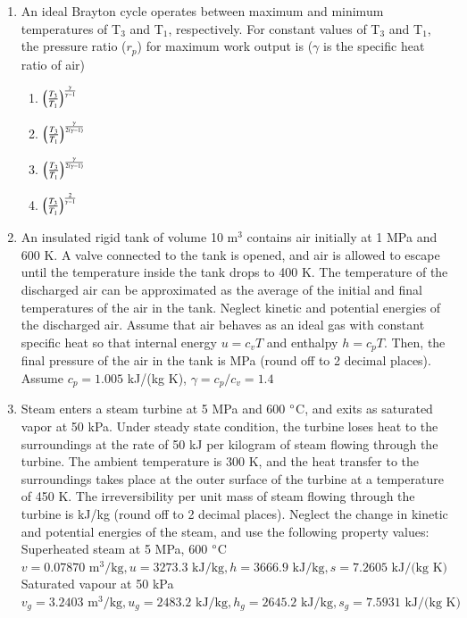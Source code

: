 \documentclass[a4paper,10pt]{article}
\begin{document}
\begin{enumerate}
\item An ideal Brayton cycle operates between maximum and minimum temperatures of T$_3$ and T$_1$, respectively. For constant values of T$_3$ and T$_1$, the pressure ratio ($r_p$) for maximum work output is ($\gamma$ is the specific heat ratio of air)

\hfill{}
\begin{enumerate}
    \item $\left(\frac{T_3}{T_1}\right)^{\frac{\gamma}{\gamma-1}}$
    \item $\left(\frac{T_3}{T_1}\right)^{\frac{\gamma}{2(\gamma-1)}}$
    \item $\left(\frac{T_3}{T_1}\right)^{\frac{\gamma}{2(\gamma-1)}}$
    \item $\left(\frac{T_3}{T_1}\right)^{\frac{2}{\gamma-1}}$
\end{enumerate}

\item An insulated rigid tank of volume 10 m$^3$ contains air initially at 1 MPa and 600 K. A valve connected to the tank is opened, and air is allowed to escape until the temperature inside the tank drops to 400 K. The temperature of the discharged air can be approximated as the average of the initial and final temperatures of the air in the tank. Neglect kinetic and potential energies of the discharged air. Assume that air behaves as an ideal gas with constant specific heat so that internal energy $u = c_vT$ and enthalpy $h = c_pT$. Then, the final pressure of the air in the tank is \underline{\hspace{2cm}} MPa (round off to 2 decimal places). Assume $c_p = 1.005$ kJ/(kg K), $\gamma = c_p/c_v = 1.4$

\hfill{}

\item Steam enters a steam turbine at 5 MPa and 600 $\degree$C, and exits as saturated vapor at 50 kPa. Under steady state condition, the turbine loses heat to the surroundings at the rate of 50 kJ per kilogram of steam flowing through the turbine. The ambient temperature is 300 K, and the heat transfer to the surroundings takes place at the outer surface of the turbine at a temperature of 450 K. The irreversibility per unit mass of steam flowing through the turbine is \underline{\hspace{2cm}} kJ/kg (round off to 2 decimal places).
Neglect the change in kinetic and potential energies of the steam, and use the following property values:
Superheated steam at 5 MPa, 600 $\degree$C
$v = 0.07870 \text{ m}^3/\text{kg}, u = 3273.3 \text{ kJ/kg}, h = 3666.9 \text{ kJ/kg}, s = 7.2605 \text{ kJ/(kg K)}$
Saturated vapour at 50 kPa
$v_g = 3.2403 \text{ m}^3/\text{kg}, u_g = 2483.2 \text{ kJ/kg}, h_g = 2645.2 \text{ kJ/kg}, s_g = 7.5931 \text{ kJ/(kg K)}$


\end{enumerate}
\end{document}
